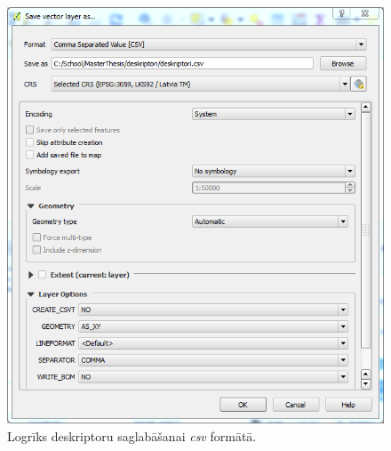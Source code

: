 \documentclass[12pt,paper=a4]{report}
\begin{document}
\begin{figure}[h!]
\centering
\includegraphics[scale=0.5]{saveAsCSV}
\caption{Logrīks deskriptoru saglabāšanai \textit{csv} formātā.}
\label{fig:csv}
\end{figure}\par
\end{document}
